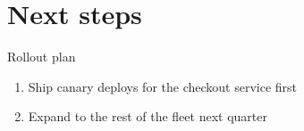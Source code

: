 \documentclass[10pt]{beamer}
\begin{document}
\section{Next steps}

\begin{frame}{Rollout plan}
  \begin{enumerate}
    \item Ship canary deploys for the checkout service first
    \item Expand to the rest of the fleet next quarter
  \end{enumerate}
\end{frame}
\end{document}
